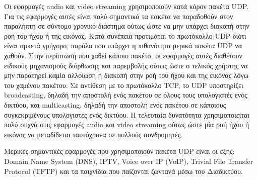 \documentclass{article}
\begin{document}
Οι εφαρμογές audio και video streaming χρησιμοποιούν κατά κόρον πακέτα UDP. Για τις εφαρμογές αυτές είναι πολύ σημαντικό τα πακέτα να παραδοθούν στον παραλήπτη σε σύντομο χρονικό διάστημα ούτως ώστε να μην υπάρχει διακοπή στην ροή του ήχου ή της εικόνας. Κατά συνέπεια προτιμάται το πρωτόκολλο UDP διότι είναι αρκετά γρήγορο, παρόλο που υπάρχει η πιθανότητα μερικά πακέτα UDP να χαθούν. Στην περίπτωση που χαθεί κάποιο πακέτο, οι εφαρμογές αυτές διαθέτουν ειδικούς μηχανισμούς διόρθωσης και παρεμβολής ούτως ώστε ο τελικός χρήστης να μην παρατηρεί καμία αλλοίωση ή διακοπή στην ροή του ήχου και της εικόνας λόγω του χαμένου πακέτου. Σε αντίθεση με το πρωτόκολλο TCP, το UDP υποστηρίζει broadcasting, δηλαδή την αποστολή ενός πακέτου σε όλους τους υπολογιστές ενός δικτύου, και multicasting, δηλαδή την αποστολή ενός πακέτου σε κάποιους συγκεκριμένους υπολογιστές ενός δικτύου. Η τελευταία δυνατότητα χρησιμοποιείται πολύ συχνά στις εφαρμογές audio και video streaming ούτως ώστε μία ροή ήχου ή εικόνας να μεταδίδεται ταυτόχρονα σε πολλούς συνδρομητές.

Μερικές σημαντικές εφαρμογές που χρησιμοποιούν πακέτα UDP είναι οι εξής: Domain Name System (DNS), IPTV, Voice over IP (VoIP), Trivial File Transfer Protocol (TFTP) και τα παιχνίδια που παίζονται ζωντανά μέσω του Διαδικτύου. 
\end{document}
